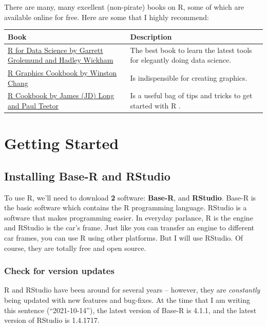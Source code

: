 \documentclass[
]{book}
\begin{document}
There are many, many excellent (non-pirate) books on R, some of which are available online for free. Here are some that I highly recommend:

\begin{longtable}[]{@{}
  >{\raggedright\arraybackslash}p{}
  >{\raggedright\arraybackslash}p{}@{}}
\toprule
Book & Description \\
\midrule
\endhead
\href{http://r4ds.had.co.nz/}{R for Data Science by Garrett Grolemund and Hadley Wickham} & The best book to learn the latest tools for elegantly doing data science. \\
\href{http://www.cookbook-r.com/Graphs/}{R Graphics Cookbook by Winston Chang} & Is indispensible for creating graphics. \\
\href{https://rc2e.com/index.html}{R Cookbook by James (JD) Long and Paul Teetor} & Is a useful bag of tips and tricks to get started with R . \\
\bottomrule
\end{longtable}

\hypertarget{get-started}{%
\chapter{Getting Started}\label{get-started}}

\hypertarget{INSTALL-GET-STARTED}{%
\section{Installing Base-R and RStudio}\label{INSTALL-GET-STARTED}}

To use R, we'll need to download \textbf{2} software: \textbf{Base-R}, and \textbf{RStudio}. Base-R is the basic software which contains the R programming language. RStudio is a software that makes programming easier. In everyday parlance, R is the engine and RStudio is the car's frame. Just like you can transfer an engine to different car frames, you can use R using other platforms. But I will use RStudio. Of course, they are totally free and open source.

\hypertarget{check-for-version-updates}{%
\subsection{Check for version updates}\label{check-for-version-updates}}

R and RStudio have been around for several years -- however, they are \emph{constantly} being updated with new features and bug-fixes. At the time that I am writing this sentence (``2021-10-14''), the latest version of Base-R is 4.1.1, and the latest version of RStudio is 1.4.1717.
\end{document}
